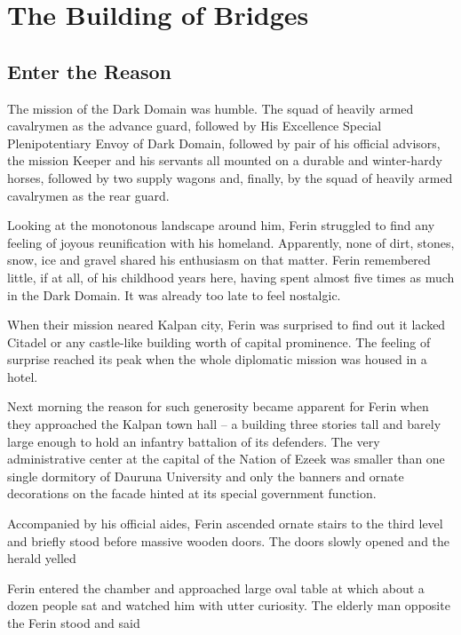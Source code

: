 \chapter{The Building of Bridges}

\section{Enter the Reason}

The mission of the Dark Domain was humble. The squad of heavily armed cavalrymen as the advance guard, followed by His Excellence Special Plenipotentiary Envoy of Dark Domain, followed by pair of his official advisors, the mission Keeper and his servants all mounted on a durable and winter-hardy horses, followed by two supply wagons and, finally, by the squad of heavily armed cavalrymen as the rear guard.

Looking at the monotonous landscape around him, Ferin struggled to find any feeling of joyous reunification with his homeland. Apparently, none of dirt, stones, snow, ice and gravel shared his enthusiasm on that matter. Ferin remembered little, if at all, of his childhood years here, having spent almost five times as much in the Dark Domain. It was already too late to feel nostalgic.

When their mission neared Kalpan city, Ferin was surprised to find out it lacked Citadel or any castle-like building worth of capital prominence. The feeling of surprise reached its peak when the whole diplomatic mission was housed in a hotel.

Next morning the reason for such generosity became apparent for Ferin when they approached the Kalpan town hall -- a building three stories tall and barely large enough to hold an infantry battalion of its defenders. The very administrative center at the capital of the Nation of Ezeek was smaller than one single dormitory of Dauruna University and only the banners and ornate decorations on the facade hinted at its special government function.

Accompanied by his official aides, Ferin ascended ornate stairs to the third level and briefly stood before massive wooden doors. The doors slowly opened and the herald yelled 

Ferin entered the chamber and approached large oval table at which about a dozen people sat and watched him with utter curiosity. The elderly man opposite the Ferin stood and said 

